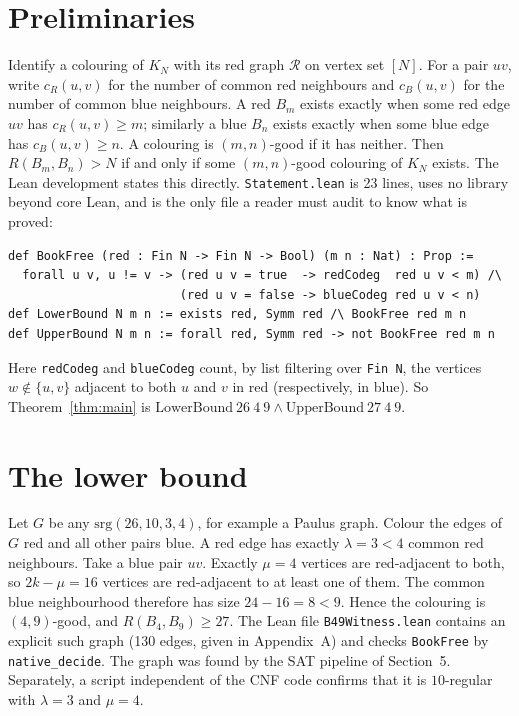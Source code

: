 \documentclass[11pt]{amsart}
\theoremstyle{definition}
\newcommand{\cR}{\mathcal{R}}
\begin{document}
\section{Preliminaries}

Identify a colouring of $K_N$ with its red graph $\cR$ on vertex set
$[N]$. For a pair $uv$, write $c_R(u,v)$ for the number of common red
neighbours and $c_B(u,v)$ for the number of common blue neighbours. A
red $B_m$ exists exactly when some red edge $uv$ has $c_R(u,v)\ge m$;
similarly a blue $B_n$ exists exactly when some blue edge has
$c_B(u,v)\ge n$. A colouring is $(m,n)$-good if it has neither. Then
$R(B_m,B_n)>N$ if and only if some $(m,n)$-good colouring of $K_N$
exists. The Lean development states this directly.
\texttt{Statement.lean} is 23 lines, uses no library beyond core Lean,
and is the only file a reader must audit to know what is proved:

\begin{lstlisting}
def BookFree (red : Fin N -> Fin N -> Bool) (m n : Nat) : Prop :=
  forall u v, u != v -> (red u v = true  -> redCodeg  red u v < m) /\
                        (red u v = false -> blueCodeg red u v < n)
def LowerBound N m n := exists red, Symm red /\ BookFree red m n
def UpperBound N m n := forall red, Symm red -> not BookFree red m n
\end{lstlisting}

Here \texttt{redCodeg} and \texttt{blueCodeg} count, by list filtering
over \texttt{Fin~N}, the vertices $w\notin\{u,v\}$ adjacent to both $u$
and $v$ in red (respectively, in blue). So Theorem~\ref{thm:main} is
$\mathrm{LowerBound}\ 26\ 4\ 9 \wedge \mathrm{UpperBound}\ 27\ 4\ 9$.

\section{The lower bound}

Let $G$ be any $\mathrm{srg}(26,10,3,4)$, for example a Paulus graph.
Colour the edges of $G$ red and all other pairs blue. A red edge has
exactly $\lambda=3<4$ common red neighbours. Take a blue pair $uv$.
Exactly $\mu=4$ vertices are red-adjacent to both, so $2k-\mu=16$
vertices are red-adjacent to at least one of them. The common blue
neighbourhood therefore has size $24-16=8<9$. Hence the colouring is
$(4,9)$-good, and $R(B_4,B_9)\ge 27$. The Lean file
\texttt{B49Witness.lean} contains an explicit such graph (130 edges,
given in Appendix~A) and checks \texttt{BookFree} by
\texttt{native\_decide}. The graph was found by the SAT pipeline of
Section~5. Separately, a script independent of the CNF code confirms
that it is $10$-regular with $\lambda=3$ and $\mu=4$.
\end{document}
